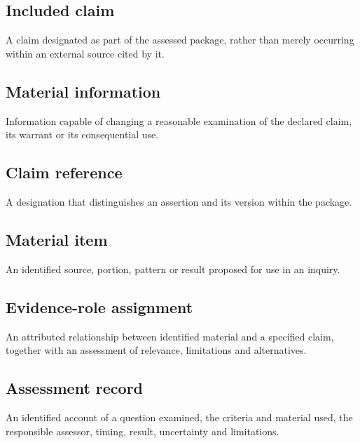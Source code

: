 \documentclass[11pt,a4paper]{article}
\begin{document}
\subsection{Included claim}
A claim designated as part of the assessed package, rather than merely occurring within an external source cited by it.

\subsection{Material information}
Information capable of changing a reasonable examination of the declared claim, its warrant or its consequential use.

\subsection{Claim reference}
A designation that distinguishes an assertion and its version within the package.

\subsection{Material item}
An identified source, portion, pattern or result proposed for use in an inquiry.

\subsection{Evidence-role assignment}
An attributed relationship between identified material and a specified claim, together with an assessment of relevance, limitations and alternatives.

\subsection{Assessment record}
An identified account of a question examined, the criteria and material used, the responsible assessor, timing, result, uncertainty and limitations.
\end{document}
